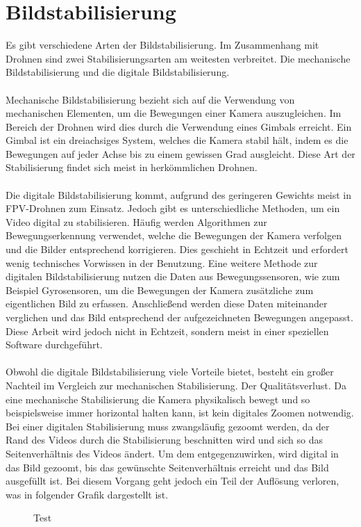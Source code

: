 \section[Bildstabilisierung]{Bildstabilisierung}
    Es gibt verschiedene Arten der Bildstabilisierung. Im Zusammenhang mit Drohnen sind zwei Stabilisierungsarten am weitesten verbreitet. Die mechanische Bildstabilisierung und die digitale Bildstabilisierung.
    \\ \\
    Mechanische Bildstabilisierung bezieht sich auf die Verwendung von mechanischen Elementen, um die Bewegungen einer Kamera auszugleichen. Im Bereich der Drohnen wird dies durch die Verwendung eines Gimbals erreicht. Ein Gimbal ist ein dreiachsiges System, welches die Kamera stabil hält, indem es die Bewegungen auf jeder Achse bis zu einem gewissen Grad ausgleicht. Diese Art der Stabilisierung findet sich meist in herkömmlichen Drohnen.
    \\ \\
    Die digitale Bildstabilisierung kommt, aufgrund des geringeren Gewichts meist in FPV-Drohnen zum Einsatz. Jedoch gibt es unterschiedliche Methoden, um ein Video digital zu stabilisieren. Häufig werden Algorithmen zur Bewegungserkennung verwendet, welche die Bewegungen der Kamera verfolgen und die Bilder entsprechend korrigieren. Dies geschieht in Echtzeit und erfordert wenig technisches Vorwissen in der Benutzung. Eine weitere Methode zur digitalen Bildstabilisierung nutzen die Daten aus Bewegungssensoren, wie zum Beispiel Gyrosensoren, um die Bewegungen der Kamera zusätzliche zum eigentlichen Bild zu erfassen. Anschließend werden diese Daten miteinander verglichen und das Bild entsprechend der aufgezeichneten Bewegungen angepasst. Diese Arbeit wird jedoch nicht in Echtzeit, sondern meist in einer speziellen Software durchgeführt.
    \\ \\
    Obwohl die digitale Bildstabilisierung viele Vorteile bietet, besteht ein großer Nachteil im Vergleich zur mechanischen Stabilisierung. Der Qualitätsverlust. Da eine mechanische Stabilisierung die Kamera physikalisch bewegt und so beispielsweise immer horizontal halten kann, ist kein digitales Zoomen notwendig. Bei einer digitalen Stabilisierung muss zwangsläufig gezoomt werden, da der Rand des Videos durch die Stabilisierung beschnitten wird und sich so das Seitenverhältnis des Videos ändert. Um dem entgegenzuwirken, wird digital in das Bild gezoomt, bis das gewünschte Seitenverhältnis erreicht und das Bild ausgefüllt ist. Bei diesem Vorgang geht jedoch ein Teil der Auflösung verloren, was in folgender Grafik dargestellt ist.

\newpage

\begin{figure}[h]
    \centering
    \def\svgwidth{420pt}
    
    \vspace{0.5cm}
    \caption{Test}
    \label{vektorgrafik}
\end{figure}